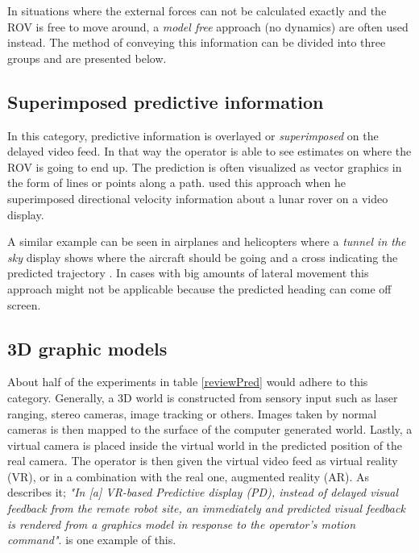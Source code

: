 In situations where the external forces can not be calculated exactly and the ROV is free to move around, a \emph{model free} approach (no dynamics) are often used instead. The method of conveying this information can be divided into three groups and are presented below.




\subsection{Superimposed predictive information}


In this category, predictive information is overlayed or \emph{superimposed} on the delayed video feed. In that way the operator is able to see estimates on where the ROV is going to end up. The prediction is often visualized as vector graphics in the form of lines or points along a path. \citep{Mathan1996} used this approach when he superimposed directional velocity information about a lunar rover on a video display.

A similar example can be seen in airplanes and helicopters where a \emph{tunnel in the sky} display shows where the aircraft should be going and a cross indicating the predicted trajectory \citep{Grunwald1981}. In cases with big amounts of lateral movement this approach might not be applicable because the predicted heading can come off screen.

\subsection{3D graphic models}

About half of the experiments in table \ref{reviewPred} would adhere to this category. Generally, a 3D world is constructed from sensory input such as laser ranging, stereo cameras, image tracking or others. Images taken by normal cameras is then mapped to the surface of the computer generated world. Lastly, a virtual camera is placed inside the virtual world in the predicted position of the real camera. The operator is then given the virtual video feed as virtual reality (VR), or in a combination with the real one, augmented reality (AR). As \citep{Hu2016} describes it; \textit{"In [a] VR-based Predictive display (PD), instead of delayed visual feedback from the remote robot site, an immediately and predicted visual feedback is rendered from a graphics model in response to the operator's motion command"}. \citep{Kim1993} is one example of this.

